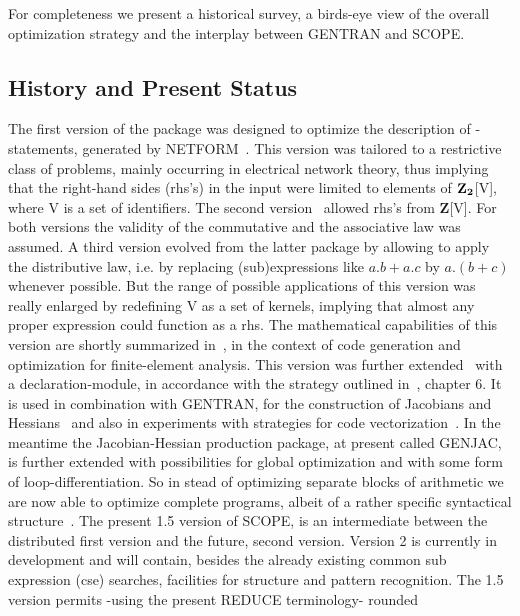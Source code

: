 For completeness we present a historical survey, a birds-eye view of the
overall optimization strategy and the interplay between GENTRAN and SCOPE.

\subsection{History and Present Status}\label{SCOPE:hito}

The first version of the package was designed to optimize the
description of {\REDUCE}-statements, generated by
NETFORM~\cite{Smit:81,Smit:82}. This
version was tailored to a restrictive class of problems, mainly occurring
in electrical network theory, thus implying that the right-hand
sides (rhs's) in the input were limited to elements of ${\rm {\bf Z_2}}$[V],
where V is a set of identifiers.  The second version~\cite{vanHulzen:83}
allowed rhs's from {\bf Z}[V]. For both versions the validity of the
commutative and the associative law was assumed.  A third version
evolved from the latter package by allowing to apply the distributive
law, i.e. by replacing (sub)expressions like $a.b  +  a.c$ by $a.(b 
+  c)$ whenever possible.  But the range of possible applications of
this version was really enlarged by redefining V as a set of kernels,
implying that almost any proper {\REDUCE}
expression could function as a rhs.  The mathematical capabilities of
this version are shortly summarized in~\cite{Wang:84}, in the context of code
generation and optimization for finite-element analysis. This version
was further extended~\cite{vanHulzen:89} with a declaration-module, 
in accordance with the strategy outlined in~\cite{Aho:86}, chapter 6. 
It is used  
in combination with GENTRAN, for 
the construction of Jacobians and Hessians~\cite{Heuvel:89,Berger:92} and 
also in experiments with strategies for code vectorization~\cite{Goldman:89}. 
In the meantime the Jacobian-Hessian production package, at present 
called GENJAC, is further extended with possibilities for global optimization
and with some form of loop-differentiation. So in stead of optimizing 
separate blocks of arithmetic we are now able to optimize complete programs,
albeit of a rather specific syntactical structure~\cite{Berger:92}.
The present 1.5 version of SCOPE, is an intermediate between the distributed first
version and the future, second version.  Version 2 is currently in 
development and will contain, besides the already existing common sub 
expression (cse) searches, facilities for structure and pattern recognition.
The 1.5 version permits -using the present REDUCE terminology- rounded
